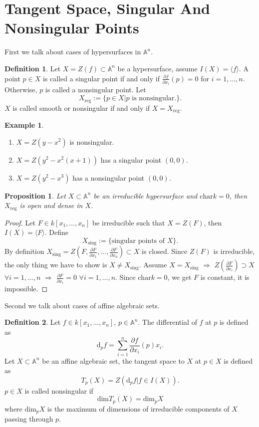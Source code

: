 \documentclass{amsart}
\theoremstyle{plain}
\newtheorem{proposition}{Proposition}
\theoremstyle{definition}
\newtheorem{definition}{Definition}
\newtheorem{example}{Example}
\theoremstyle{remark}
\numberwithin{equation}{section}
\begin{document}
\section{Tangent Space, Singular And Nonsingular Points}
First we talk about cases of hypersurfaces in $ \mathbb{A}^n $.
\begin{definition}
	Let $ X=Z(f)\subset \mathbb{A}^n $ be a hypersurface, assume $ I(X)=\langle f \rangle $. A point $ p\in X $ is called a singular point if and only if $ \frac{\partial f}{\partial x_i}(p)=0 $ for $ i=1,\dots,n $. Otherwise, $ p $ is called a nonsingular point. Let 
	$$
	X_{\mathrm{reg}}:=\lbrace p\in X|p\text{ is nonsingular}. \rbrace.
	$$
	$ X $ is called smooth or nonsingular if and only if $ X=X_{\mathrm{reg}} $.
\end{definition}
\begin{example}
	\begin{enumerate}
		\item $ X=Z(y-x^2) $ is nonsingular.
		\item $ X=Z(y^2-x^2(x+1)) $ has a singular point $ (0,0) $.
		\item $ X=Z(y^2-x^3) $ has a nonsingular point $ (0,0) $.
	\end{enumerate}
\end{example}
\begin{proposition}
	Let $ X\subset \mathbb{A}^n $ be an irreducible hypersurface and $ \text{char}k=0 $, then $ X_{\mathrm{reg}} $ is open and dense in $ X $.
\end{proposition}
\begin{proof}
	Let $ F\in k[x_1,\dots,x_n] $ be irreducible such that $ X=Z(F) $, then $ I(X)=\langle F \rangle $. Define
	$$
	X_{\mathrm{sing}}:=\lbrace \text{singular points of } X \rbrace.
	$$ 
	By definition $ X_{\mathrm{sing}}= Z(F,\frac{\partial F}{\partial x_1},\dots,\frac{\partial F}{\partial x_n}) \subset X$ is closed. Since $ Z(F) $ is irreducible, the only thing we have to show is $ X\neq X_{\mathrm{sing}} $. Assume $ X=X_{\mathrm{sing}} $ $ \Rightarrow $ $ Z(\frac{\partial F}{\partial x_i})\supset X $ $ \forall i=1,\dots,n $ $ \Rightarrow $ $ \frac{\partial F}{\partial x_i}=0 $ $ \forall i=1,\dots,n $. Since $ \text{char}k=0 $, we get $ F $ is constant, it is impossible.
\end{proof}
Second we talk about cases of affine algebraic sets.
\begin{definition}
	Let $ f\in k[x_1,\dots,x_n] $, $ p\in\mathbb{A}^n $. The differential of $ f $ at $ p $ is defined as 
	$$
	\text{d}_p f=\sum\limits_{i=1}^{n}\frac{\partial f}{\partial x_i}(p)x_i.
	$$
	Let $ X\subset \mathbb{A}^n $ be an affine algebraic set, the tangent space to $ X $ at $ p\in X $ is defined as
	$$
	T_p(X)=Z(\mathrm{d}_p f| f\in I(X)).
	$$
	$ p\in X $ is called  nonsingular if 
	$$
	\mathrm{dim}T_p(X)= \mathrm{dim}_pX
	$$ 
	where $ \mathrm{dim}_pX $ is the maximum of dimensions of irreducible components of $ X $ passing through $ p $.
\end{definition}
\end{document}
